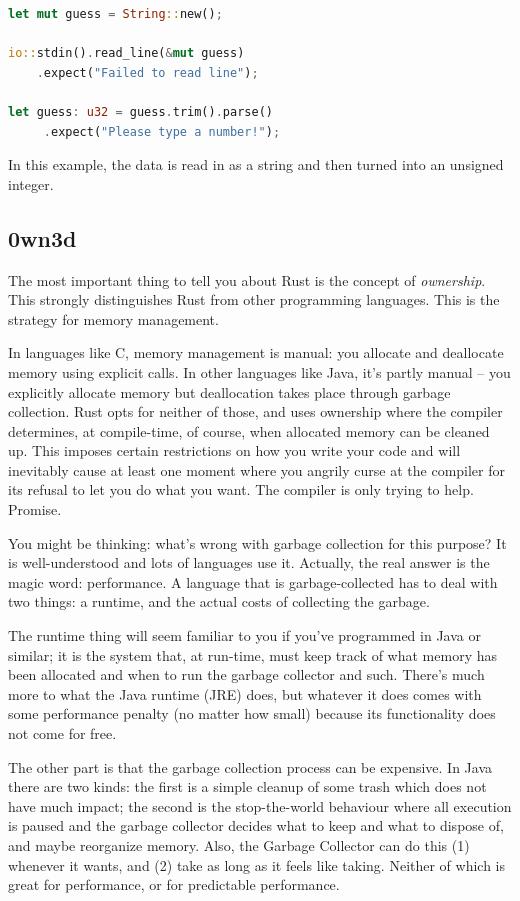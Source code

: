 \begin{lstlisting}[language=Rust]
let mut guess = String::new();

io::stdin().read_line(&mut guess)
    .expect("Failed to read line");

let guess: u32 = guess.trim().parse()
     .expect("Please type a number!");
\end{lstlisting}

In this example, the data is read in as a string and then turned into an unsigned integer.

\subsection*{0wn3d} The most important thing to tell you about Rust is the concept of \textit{ownership}. This strongly distinguishes Rust from other programming languages. This is the strategy for memory management. 

In languages like C, memory management is manual: you allocate and deallocate memory using explicit calls. In other languages like Java, it's partly manual -- you explicitly allocate memory but deallocation takes place through garbage collection. Rust opts for neither of those, and uses ownership where the compiler determines, at compile-time, of course, when allocated memory can be cleaned up. This imposes certain restrictions on how you write your code and will inevitably cause at least one moment where you angrily curse at the compiler for its refusal to let you do what you want. The compiler is only trying to help. Promise.

You might be thinking: what's wrong with garbage collection for this purpose? It is well-understood and lots of languages use it. Actually, the real answer is the magic word: performance. A language that is garbage-collected has to deal with two things: a runtime, and the actual costs of collecting the garbage.

The runtime thing will seem familiar to you if you've programmed in Java or similar; it is the system that, at run-time, must keep track of what memory has been allocated and when to run the garbage collector and such. There's much more to what the Java runtime (JRE) does, but whatever it does comes with some performance penalty (no matter how small) because its functionality does not come for free. 

The other part is that the garbage collection process can be expensive. In Java there are two kinds: the first is a simple cleanup of some trash which does not have much impact; the second is the stop-the-world behaviour where all execution is paused and the garbage collector decides what to keep and what to dispose of, and maybe reorganize memory.  Also, the Garbage Collector can do this (1) whenever it wants, and (2) take as long as it feels like taking. Neither of which is great for performance, or for predictable performance.

